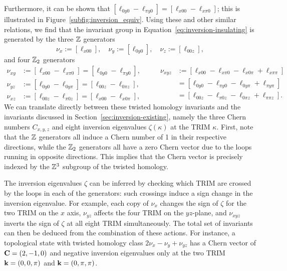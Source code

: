 Furthermore, it can be shown that $[\ell_{0y0} - \ell_{\pi y0}] = [\ell_{x00} - \ell_{x\pi0}]$; this is illustrated in Figure~\ref{subfig:inversion_equiv}. Using these and other similar relations, we find that the invariant group in Equation~\eqref{eq:inversion-insulating} is generated by the three $\mathbb{Z}$ generators
\begin{equation*}
	\nu_x := [\ell_{x00}],\quad \nu_y := [\ell_{0y0}],\quad \nu_z := [\ell_{00z}],
\end{equation*}
and four $\mathbb{Z}_2$ generators
\begin{equation*}
\begin{split}
	\nu_{xy} &:= [\ell_{x00} - \ell_{x\pi0}] = [\ell_{0y0} - \ell_{\pi y0}], \\
	\nu_{yz} &:= [\ell_{0y0} - \ell_{0y\pi}] = [\ell_{00z} - \ell_{0\pi z}], \\
	\nu_{xz} &:= [\ell_{00z} - \ell_{\pi0z}] = [\ell_{x00} - \ell_{x0\pi}],
\end{split}\qquad
\begin{split}
	\nu_{xyz} &:= [\ell_{x00} - \ell_{x\pi0} - \ell_{x0\pi} + \ell_{x\pi\pi}] \\
		&= [\ell_{0y0} - \ell_{\pi y0} - \ell_{0y\pi} + \ell_{\pi y\pi}] \\
		&= [\ell_{00z} - \ell_{\pi0z} - \ell_{0\pi z} + \ell_{\pi\pi z}].
\end{split}
\end{equation*}
We can translate directly between these twisted homology invariants and the invariants discussed in Section~\ref{sec:inversion-existing}, namely the three Chern numbers $C_{x,y,z}$ and eight inversion eigenvalues $\zeta(\kappa)$ at the TRIM $\kappa$. First, note that the $\mathbb{Z}$ generators all induce a Chern number of 1 in their respective directions, while the $\mathbb{Z}_2$ generators all have a zero Chern vector due to the loops running in opposite directions. This implies that the Chern vector is precisely indexed by the $\mathbb{Z}^3$ subgroup of the twisted homology.

The inversion eigenvalues $\zeta$ can be inferred by checking which TRIM are crossed by the loops in each of the generators: such crossings induce a sign change in the inversion eigenvalue. For example, each copy of $\nu_x$ changes the sign of $\zeta$ for the two TRIM on the $x$ axis, $\nu_{yz}$ affects the four TRIM on the $yz$-plane, and $\nu_{xyz}$ inverts the sign of $\zeta$ at all eight TRIM simultaneously. The total set of invariants can then be deduced from the combination of these actions. For instance, a topological state with twisted homology class $2\nu_x - \nu_y + \nu_{yz}$ has a Chern vector of $\vb{C}=(2,-1,0)$ and negative inversion eigenvalues only at the two TRIM $\vb{k}=(0,0,\pi)$ and $\vb{k}=(0,\pi,\pi)$.

